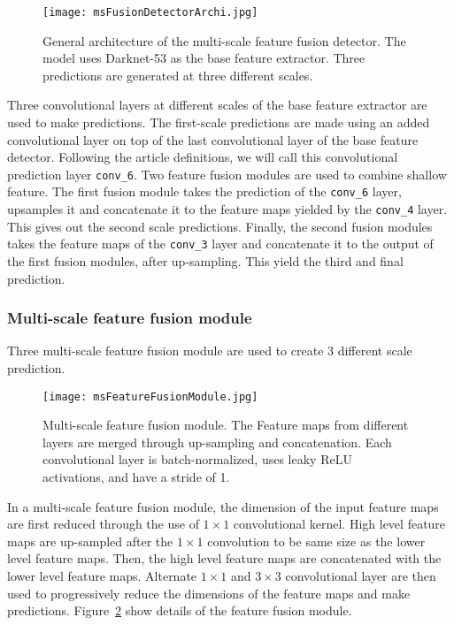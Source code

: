 \begin{figure}[h!]
	\centering
	\texttt{[image: msFusionDetectorArchi.jpg]}
	\caption[]{General architecture of the multi-scale feature fusion detector. The model uses Darknet-53 as the base feature extractor. Three predictions are generated at three different scales.}
	\label{}
\end{figure}

Three convolutional layers at different scales of the base feature extractor are used to make predictions. The first-scale predictions are made using an added convolutional layer on top of the last convolutional layer of the base feature detector. Following the article definitions, we will call this convolutional prediction layer \verb|conv_6|. Two feature fusion modules are used to combine shallow feature. The first fusion module takes the prediction of the \verb|conv_6| layer, upsamples it and concatenate it to the feature maps yielded by the \verb|conv_4| layer. This gives out the second scale predictions. Finally, the second fusion modules takes the feature maps of the \verb|conv_3| layer and concatenate it to the output of the first fusion modules, after up-sampling. This yield the third and final prediction. 

\subsubsection{Multi-scale feature fusion module}
Three multi-scale feature fusion module are used to create 3 different scale prediction. 

\begin{figure}
	\centering
	\texttt{[image: msFeatureFusionModule.jpg]}
	\caption[]{Multi-scale feature fusion module. The Feature maps from different layers are merged through up-sampling and concatenation. Each convolutional layer is batch-normalized, uses leaky ReLU activations, and have a stride of 1.}
	\label{fig:multiScaleFusionModule}
\end{figure}

In a multi-scale feature fusion module, the dimension of the input feature maps are first reduced through the use of $1 \times 1$ convolutional kernel. High level feature maps are up-sampled after the $1 \times 1$ convolution to be same size as the lower level feature maps. Then, the high level feature maps are concatenated with the lower level feature maps. Alternate $1 \times 1$ and $3 \times 3$ convolutional layer are then used to progressively reduce the dimensions of the feature maps and make predictions. Figure~\ref{fig:multiScaleFusionModule} show details of the feature fusion module.

